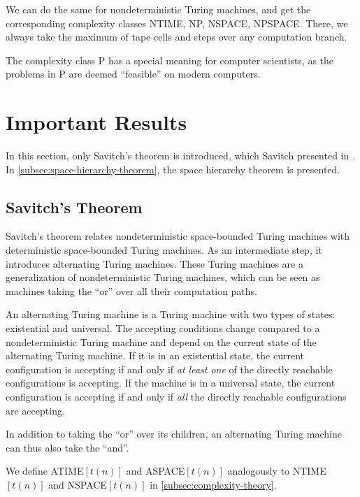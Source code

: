 We can do the same for nondeterministic Turing machines, and get the corresponding complexity classes \acs{NTIME}, \acs{NP}, \acs{NSPACE}, \acs{NPSPACE}\@.
There, we always take the maximum of tape cells and steps over any computation branch.

The complexity class \acs{P} has a special meaning for computer scientists, as the problems in \acs{P} are deemed ``feasible'' on modern computers.


\section{Important Results}\label{sec:important-results}

In this section, only Savitch's theorem is introduced, which Savitch presented in \cite{Savitch1970}.
In \cref{subsec:space-hierarchy-theorem}, the space hierarchy theorem is presented.

\subsection{Savitch's Theorem}\label{subsec:nspacesubsetdspacesquared}

Savitch's theorem relates nondeterministic space-bounded Turing machines with deterministic space-bounded Turing machines.
As an intermediate step, it introduces alternating Turing machines.
These Turing machines are a generalization of nondeterministic Turing machines, which can be seen as machines taking the ``or'' over all their computation paths.

\begin{define}
    An alternating Turing machine is a Turing machine with two types of states: existential and universal.
    The accepting conditions change compared to a nondeterministic Turing machine and depend on the current state of the alternating Turing machine.
    If it is in an existential state, the current configuration is accepting if and only if \emph{at least one} of the directly reachable configurations is accepting.
    If the machine is in a universal state, the current configuration is accepting if and only if \emph{all} the directly reachable configurations are accepting.
\end{define}

In addition to taking the ``or'' over its children, an alternating Turing machine can thus also take the ``and''.

\sloppy We define \acs{ATIME}$[t(n)]$ and \acs{ASPACE}$[t(n)]$ analogously to \acs{NTIME}$[t(n)]$ and \acs{NSPACE}$[t(n)]$ in \cref{subsec:complexity-theory}.

